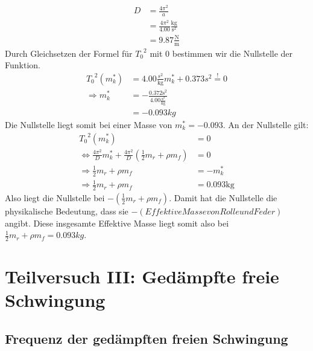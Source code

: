 \documentclass{report}
\begin{document}
\begin{equation}
    \begin{split}
        D &= \frac{4 \pi^2}{a} \\
          &= \frac{4 \pi^2}{4.00} \frac{\si{\kg}}{\si{\s^2}} \\
          &= 9.87 \frac{\si{\N}}{\si{\m}}
    \end{split}
\end{equation}
Durch Gleichsetzen der Formel für ${T_0}^2$ mit 0 bestimmen wir die Nullstelle der Funktion.
\begin{equation}
    \begin{split}
        {T_0}^2(m_k^*) &= 4.00\frac{{\si{s}}^2}{\si{\kg}}m_k^* + 0.373{\si{s}}^2 \overset{!}{=} 0 \\
        \Rightarrow m_k^* &= -\frac{0.372 {\si{\s}}^2}{4.00 \frac{{\si{\s}}^2}{\si{\kg}}} \\
        &= \boxed{-0.093kg}
    \end{split}
\end{equation}
Die Nullstelle liegt somit bei einer Masse von $m_k^* = -0.093$.
An der Nullstelle gilt:
\begin{equation}
    \begin{split}
        {T_0}^2(m_k^*) &= 0 \\
        \Leftrightarrow \frac{4 \pi^2}{D} m_k^* + \frac{4 \pi^2}{D} \left(\frac{1}{2} m_r + \rho m_f\right) &= 0 \\
        \Rightarrow  \frac{1}{2}m_r + \rho m_f &= -m_k^* \\
        \Rightarrow  \frac{1}{2}m_r + \rho m_f &= \boxed{0.093\si{\kg}}
    \end{split}
\end{equation}
Also liegt die Nullstelle bei $-(\frac{1}{2}m_r + \rho m_f)$. Damit hat die Nullstelle die physikalische Bedeutung, dass sie $\mathit{-(Effektive Masse von Rolle und Feder)}$ angibt.
Diese insgesamte Effektive Masse liegt somit also bei $\frac{1}{2}m_r + \rho m_f = 0.093kg$.










\newpage
\section{Teilversuch III: Gedämpfte freie Schwingung}
\subsection*{Frequenz der gedämpften freien Schwingung}
\end{document}
